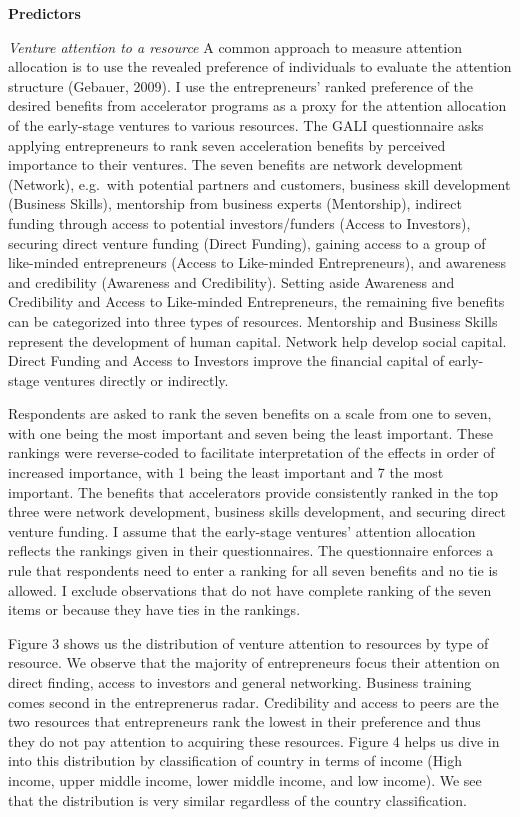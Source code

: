\documentclass[
  english,
  man]{apa6}
\begin{document}
\textbf{Predictors}

\emph{Venture attention to a resource} A common approach to measure attention allocation is to use the revealed preference of individuals to evaluate the attention structure (Gebauer, 2009). I use the entrepreneurs' ranked preference of the desired benefits from accelerator programs as a proxy for the attention allocation of the early-stage ventures to various resources. The GALI questionnaire asks applying entrepreneurs to rank seven acceleration benefits by perceived importance to their ventures. The seven benefits are network development (Network), e.g.~with potential partners and customers, business skill development (Business Skills), mentorship from business experts (Mentorship), indirect funding through access to potential investors/funders (Access to Investors), securing direct venture funding (Direct Funding), gaining access to a group of like-minded entrepreneurs (Access to Like-minded Entrepreneurs), and awareness and credibility (Awareness and Credibility). Setting aside Awareness and Credibility and Access to Like-minded Entrepreneurs, the remaining five benefits can be categorized into three types of resources. Mentorship and Business Skills represent the development of human capital. Network help develop social capital. Direct Funding and Access to Investors improve the financial capital of early-stage ventures directly or indirectly.

Respondents are asked to rank the seven benefits on a scale from one to seven, with one being the most important and seven being the least important. These rankings were reverse-coded to facilitate interpretation of the effects in order of increased importance, with 1 being the least important and 7 the most important. The benefits that accelerators provide consistently ranked in the top three were network development, business skills development, and securing direct venture funding. I assume that the early-stage ventures' attention allocation reflects the rankings given in their questionnaires. The questionnaire enforces a rule that respondents need to enter a ranking for all seven benefits and no tie is allowed. I exclude observations that do not have complete ranking of the seven items or because they have ties in the rankings.

Figure 3 shows us the distribution of venture attention to resources by type of resource. We observe that the majority of entrepreneurs focus their attention on direct finding, access to investors and general networking. Business training comes second in the entreprenerus radar. Credibility and access to peers are the two resources that entrepreneurs rank the lowest in their preference and thus they do not pay attention to acquiring these resources. Figure 4 helps us dive in into this distribution by classification of country in terms of income (High income, upper middle income, lower middle income, and low income). We see that the distribution is very similar regardless of the country classification.
\end{document}
